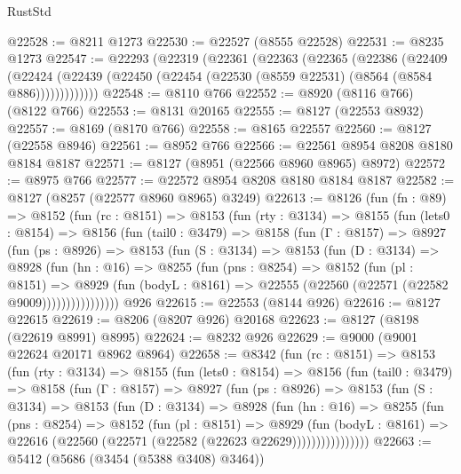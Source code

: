\begin{lexlean}{RustStd}
\begin{coremodule}
@22528 := @8211 @1273
@22530 := @22527 (@8555 @22528)
@22531 := @8235 @1273
@22547 := @22293
    (@22319
      (@22361
        (@22363
          (@22365
            (@22386
              (@22409
                (@22424
                  (@22439 (@22450 (@22454 (@22530 (@8559 @22531) (@8564 (@8584 @886)))))))))))))
@22548 := @8110 @766
@22552 := @8920 (@8116 @766) (@8122 @766)
@22553 := @8131 @20165
@22555 := @8127 (@22553 @8932)
@22557 := @8169 (@8170 @766)
@22558 := @8165 @22557
@22560 := @8127 (@22558 @8946)
@22561 := @8952 @766
@22566 := @22561 @8954 @8208 @8180 @8184 @8187
@22571 := @8127 (@8951 (@22566 @8960 @8965) @8972)
@22572 := @8975 @766
@22577 := @22572 @8954 @8208 @8180 @8184 @8187
@22582 := @8127 (@8257 (@22577 @8960 @8965) @3249)
@22613 := @8126
    (fun (fn : @89) =>
    @8152
      (fun (rc : @8151) =>
      @8153
        (fun (rty : @3134) =>
        @8155
          (fun (lets0 : @8154) =>
          @8156
            (fun (tail0 : @3479) =>
            @8158
              (fun (Γ : @8157) =>
              @8927
                (fun (ps : @8926) =>
                @8153
                  (fun (S : @3134) =>
                  @8153
                    (fun (D : @3134) =>
                    @8928
                      (fun (hn : @16) =>
                      @8255
                        (fun (pns : @8254) =>
                        @8152
                          (fun (pl : @8151) =>
                          @8929
                            (fun (bodyL : @8161) =>
                            @22555 (@22560 (@22571 (@22582 @9009))))))))))))))))
    @926
@22615 := @22553 (@8144 @926)
@22616 := @8127 @22615
@22619 := @8206 (@8207 @926) @20168
@22623 := @8127 (@8198 (@22619 @8991) @8995)
@22624 := @8232 @926
@22629 := @9000 (@9001 @22624 @20171 @8962 @8964)
@22658 := @8342
    (fun (rc : @8151) =>
    @8153
      (fun (rty : @3134) =>
      @8155
        (fun (lets0 : @8154) =>
        @8156
          (fun (tail0 : @3479) =>
          @8158
            (fun (Γ : @8157) =>
            @8927
              (fun (ps : @8926) =>
              @8153
                (fun (S : @3134) =>
                @8153
                  (fun (D : @3134) =>
                  @8928
                    (fun (hn : @16) =>
                    @8255
                      (fun (pns : @8254) =>
                      @8152
                        (fun (pl : @8151) =>
                        @8929
                          (fun (bodyL : @8161) =>
                          @22616 (@22560 (@22571 (@22582 (@22623 @22629))))))))))))))))
@22663 := @5412 (@5686 (@3454 (@5388 @3408) @3464))

\end{coremodule}
\end{lexlean}
